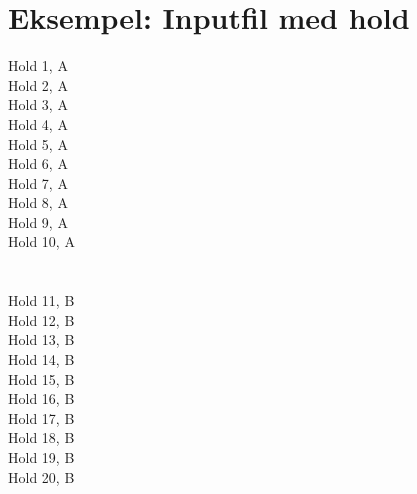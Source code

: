 \chapter{Eksempel: Inputfil med hold}\label{ch:appIlabel}

Hold 1, A\\
Hold 2, A\\
Hold 3, A\\
Hold 4, A\\
Hold 5, A\\
Hold 6, A\\
Hold 7, A\\
Hold 8, A\\
Hold 9, A\\
Hold 10, A\\
\\\\
Hold 11, B\\
Hold 12, B\\
Hold 13, B\\
Hold 14, B\\
Hold 15, B\\
Hold 16, B\\
Hold 17, B\\
Hold 18, B\\
Hold 19, B\\
Hold 20, B\\